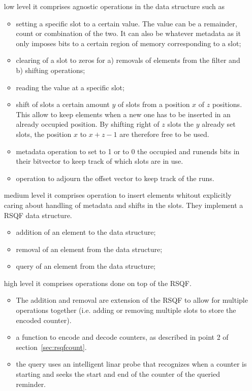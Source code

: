\begin{itemize}
	\item[low level] it comprises agnostic operations in the data structure such as
	\begin{itemize}
		\item setting a specific slot to a certain value. The value can be a remainder, count or combination of the two. It can also be whatever metadata as it only imposes bits to a certain region of memory corresponding to a slot;
		\item clearing of a slot to zeros for a) removals of elements from the filter and b) shifting operations;
		\item reading the value at a specific slot;
		\item shift of slots a certain amount $y$ of slots from a position $x$ of $z$ positions. This allow to keep elements when a new one has to be inserted in an already occupied position. By shifting right of $z$ slots the $y$ already set slots, the position $x$ to $x+z-1$ are therefore free to be used.
		\item metadata operation to set to 1 or to 0 the occupied and runends bits in their bitvector to keep track of which slots are in use.
		\item operation to adjourn the offset vector to keep track of the runs.
	\end{itemize}
	\item[medium level] it comprises operation to insert elements whitout explicitly caring about handling of metadata and shifts in the slots. They implement a RSQF data structure.
	\begin{itemize}
		\item addition of an element to the data structure;
		\item removal of an element from the data structure;
		\item query of an element from the data structure;
	\end{itemize}
	\item[high level] it comprises operations done on top of the RSQF. 
	\begin{itemize}
		\item The addition and removal are extension of the RSQF to allow for multiple operations together (i.e. adding or removing multiple slots to store the encoded counter).
		\item a function to encode and decode counters, as described in point 2 of section~\ref{sec:rsqfcount}.
		\item the query uses an intelligent linar probe that recognizes when a counter is starting and seeks the start and end of the counter of the queried reminder.

\end{itemize}
\end{itemize}
